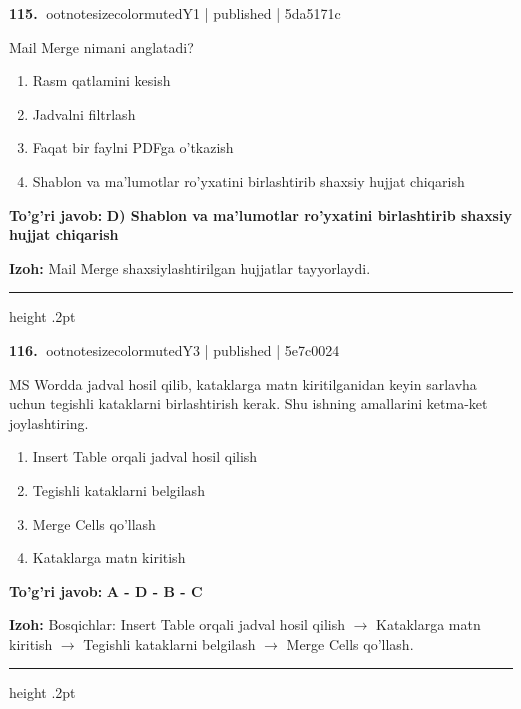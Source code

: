 \documentclass[10pt,a4paper]{article}
\begin{document}
\textbf{\color{ink}115.} {ootnotesizecolor{muted}Y1 | published | 5da5171c}
\par
Mail Merge nimani anglatadi?
\begin{enumerate}[label=\Alph*),leftmargin=9mm]
\item Rasm qatlamini kesish
\item Jadvalni filtrlash
\item Faqat bir faylni PDFga o'tkazish
\item Shablon va ma'lumotlar ro'yxatini birlashtirib shaxsiy hujjat chiqarish
\end{enumerate}
\begin{tcolorbox}[enhanced,breakable,colback=teal!4,colframe=teal!55!black,boxrule=0.45pt,arc=1.2mm,left=2.8mm,right=2.8mm,top=2mm,bottom=2mm]
\textbf{\color{teal}To'g'ri javob:} \textbf{D) Shablon va ma'lumotlar ro'yxatini birlashtirib shaxsiy hujjat chiqarish}
\par\smallskip
\textbf{Izoh:} Mail Merge shaxsiylashtirilgan hujjatlar tayyorlaydi.
\end{tcolorbox}
\vspace{2mm}\hrule height .2pt\vspace{2mm}

\textbf{\color{ink}116.} {ootnotesizecolor{muted}Y3 | published | 5e7c0024}
\par
MS Wordda jadval hosil qilib, kataklarga matn kiritilganidan keyin sarlavha uchun tegishli kataklarni birlashtirish kerak. Shu ishning amallarini ketma-ket joylashtiring.
\begin{enumerate}[label=\Alph*),leftmargin=9mm]
\item Insert Table orqali jadval hosil qilish
\item Tegishli kataklarni belgilash
\item Merge Cells qo'llash
\item Kataklarga matn kiritish
\end{enumerate}
\begin{tcolorbox}[enhanced,breakable,colback=teal!4,colframe=teal!55!black,boxrule=0.45pt,arc=1.2mm,left=2.8mm,right=2.8mm,top=2mm,bottom=2mm]
\textbf{\color{teal}To'g'ri javob:} \textbf{A - D - B - C}
\par\smallskip
\textbf{Izoh:} Bosqichlar: Insert Table orqali jadval hosil qilish \ensuremath{\rightarrow} Kataklarga matn kiritish \ensuremath{\rightarrow} Tegishli kataklarni belgilash \ensuremath{\rightarrow} Merge Cells qo'llash.
\end{tcolorbox}
\vspace{2mm}\hrule height .2pt\vspace{2mm}
\end{document}
